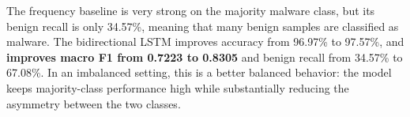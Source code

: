 The frequency baseline is very strong on the majority malware class, but its benign recall is only 34.57\%, meaning that many benign samples are classified as malware. The bidirectional LSTM improves accuracy from 96.97\% to 97.57\%, and \textbf{improves macro F1 from 0.7223 to 0.8305} and benign recall from 34.57\% to 67.08\%. In an imbalanced setting, this is a better balanced behavior: the model keeps majority-class performance high while substantially reducing the asymmetry between the two classes.
